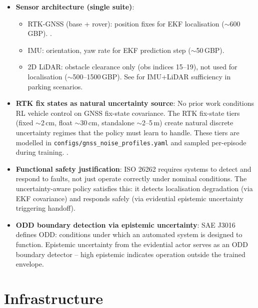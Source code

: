 \documentclass[11pt,a4paper]{article}
\begin{document}
\begin{itemize}[leftmargin=*]
  \item \textbf{Sensor architecture (single suite)}:
        \begin{itemize}
          \item RTK-GNSS (base + rover): position fixes for EKF localisation
                ($\sim$600\,GBP). \cite{takasu2009rtklib, reid2019localization}.
          \item IMU: orientation, yaw rate for EKF prediction step ($\sim$50\,GBP).
          \item 2D LiDAR: obstacle clearance only (obs indices 15--19), not used
                for localisation ($\sim$500--1500\,GBP).
                See \cite{tang2015lidar, niu2017online, chen2020lidar} for
                IMU+LiDAR sufficiency in parking scenarios.
        \end{itemize}

  \item \textbf{RTK fix states as natural uncertainty source}:
        No prior work conditions RL vehicle control on GNSS fix-state covariance.
        The RTK fix-state tiers (fixed $\sim$2\,cm, float $\sim$30\,cm,
        standalone $\sim$2--5\,m) create natural discrete uncertainty regimes
        that the policy must learn to handle. These tiers are modelled in
        \texttt{configs/gnss\_noise\_profiles.yaml} and sampled per-episode
        during training. \cite{reid2019localization, groves2013gnss}.

  \item \textbf{Functional safety justification}:
        ISO 26262 \cite{iso26262} requires systems to detect and respond to
        faults, not just operate correctly under nominal conditions. The
        uncertainty-aware policy satisfies this: it detects localisation
        degradation (via EKF covariance) and responds safely (via evidential
        epistemic uncertainty triggering handoff).

  \item \textbf{ODD boundary detection via epistemic uncertainty}:
        SAE J3016 \cite{sae_j3016} defines ODD: conditions under which an
        automated system is designed to function. Epistemic uncertainty from
        the evidential actor serves as an ODD boundary detector -- high
        epistemic indicates operation outside the trained envelope.
\end{itemize}

\section{Infrastructure}
\end{document}
